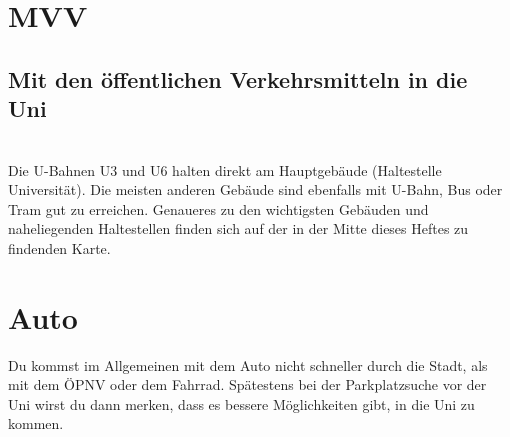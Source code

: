 

\section{MVV}

\subsection*{Mit den öffentlichen Verkehrsmitteln in die Uni}\hfill\\
Die U-Bahnen U3 und U6 halten direkt am Hauptgebäude (Haltestelle Universität). Die meisten anderen Gebäude sind ebenfalls mit U-Bahn, Bus oder Tram gut zu erreichen. Genaueres zu den wichtigsten Gebäuden und naheliegenden Haltestellen finden sich auf der in der Mitte dieses Heftes zu findenden Karte.





\section{Auto}
Du kommst im Allgemeinen mit dem Auto nicht schneller durch die Stadt, als mit dem ÖPNV oder dem Fahrrad. Spätestens bei der Parkplatzsuche vor der Uni wirst du dann merken, dass es bessere Möglichkeiten gibt, in die Uni zu kommen.
